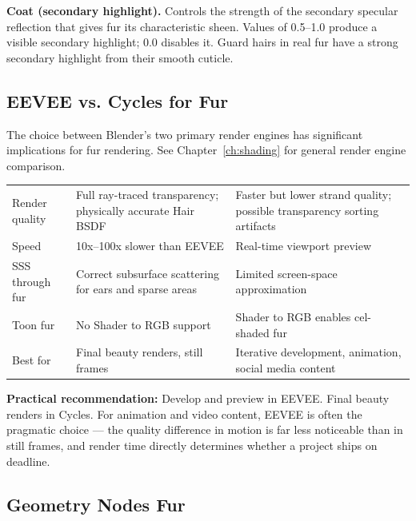 \textbf{Coat (secondary highlight).} Controls the strength of the secondary specular reflection that gives fur its characteristic sheen. Values of 0.5--1.0 produce a visible secondary highlight; 0.0 disables it. Guard hairs in real fur have a strong secondary highlight from their smooth cuticle.


\subsection{EEVEE vs. Cycles for Fur}

The choice between Blender's two primary render engines has significant implications for fur rendering. See Chapter~\ref{ch:shading} for general render engine comparison.

\begin{center}
\begin{tabularx}{\textwidth}{L{2.5cm}XX}
\toprule
{}
 &  &  \\
\midrule
Render quality & Full ray-traced transparency; physically accurate Hair BSDF & Faster but lower strand quality; possible transparency sorting artifacts \\
Speed & 10x--100x slower than EEVEE & Real-time viewport preview \\
SSS through fur & Correct subsurface scattering for ears and sparse areas & Limited screen-space approximation \\
Toon fur & No Shader to RGB support & Shader to RGB enables cel-shaded fur \\
Best for & Final beauty renders, still frames & Iterative development, animation, social media content \\
\bottomrule
\end{tabularx}
\end{center}

\begin{tipbox}
\textbf{Practical recommendation:} Develop and preview in EEVEE. Final beauty renders in Cycles. For animation and video content, EEVEE is often the pragmatic choice --- the quality difference in motion is far less noticeable than in still frames, and render time directly determines whether a project ships on deadline.
\end{tipbox}


\subsection{Geometry Nodes Fur}
\label{subsec:gn-fur}

